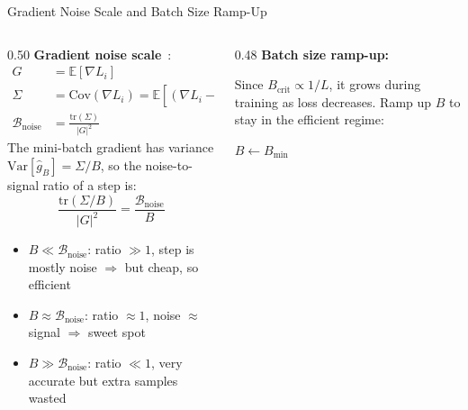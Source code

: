 \begin{frame}{Gradient Noise Scale and Batch Size Ramp-Up}

  \begin{columns}[T]
    \begin{column}{0.50\textwidth}
      \textbf{Gradient noise scale}~\cite{mccandlish2018empirical}:
      \begin{align*}
        G &= \mathbb{E}[\nabla L_i] \\
        \Sigma &= \text{Cov}(\nabla L_i) = \mathbb{E}[(\nabla L_i - G)(\nabla L_i - G)^\top] \\
        \mathcal{B}_{\text{noise}} &= \frac{\text{tr}(\Sigma)}{|G|^2}
      \end{align*}
      The mini-batch gradient has variance $\text{Var}[\hat{g}_B] = \Sigma / B$, so the noise-to-signal ratio of a step is:
      \[
        \frac{\text{tr}(\Sigma / B)}{|G|^2} = \frac{\mathcal{B}_{\text{noise}}}{B}
      \]
      \begin{itemize}
        \item $B \ll \mathcal{B}_{\text{noise}}$: ratio $\gg 1$, step is mostly noise $\Rightarrow$ but cheap, so efficient
        \item $B \approx \mathcal{B}_{\text{noise}}$: ratio $\approx 1$, noise $\approx$ signal $\Rightarrow$ sweet spot
        \item $B \gg \mathcal{B}_{\text{noise}}$: ratio $\ll 1$, very accurate but extra samples wasted
      \end{itemize}
    \end{column}
    \begin{column}{0.48\textwidth}
      \textbf{Batch size ramp-up:}

      Since $B_{\text{crit}} \propto 1/L$, it grows during training as loss decreases. Ramp up $B$ to stay in the efficient regime:

      \medskip
      \begin{algorithm}[H]
        \small
        \caption{Batch Size Schedule}
        $B \gets B_{\min}$\;
      \end{algorithm}


\end{column}
\end{columns}
\end{frame}
